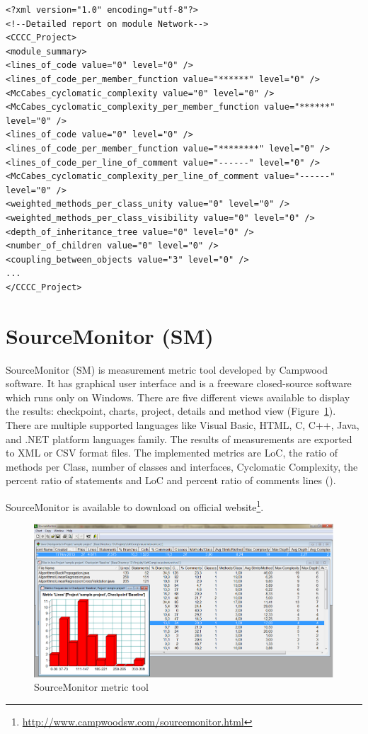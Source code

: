 \begin{lstlisting}[caption=XML representation of results generated by CCCC metric tool, label=ccccXml]
<?xml version="1.0" encoding="utf-8"?>
<!--Detailed report on module Network-->
<CCCC_Project>
<module_summary>
<lines_of_code value="0" level="0" />
<lines_of_code_per_member_function value="******" level="0" />
<McCabes_cyclomatic_complexity value="0" level="0" />
<McCabes_cyclomatic_complexity_per_member_function value="******" level="0" />
<lines_of_code value="0" level="0" />
<lines_of_code_per_member_function value="********" level="0" />
<lines_of_code_per_line_of_comment value="------" level="0" />
<McCabes_cyclomatic_complexity_per_line_of_comment value="------" level="0" />
<weighted_methods_per_class_unity value="0" level="0" />
<weighted_methods_per_class_visibility value="0" level="0" />
<depth_of_inheritance_tree value="0" level="0" />
<number_of_children value="0" level="0" />
<coupling_between_objects value="3" level="0" />
...
</CCCC_Project>
\end{lstlisting}

\section{SourceMonitor (SM)}
SourceMonitor (SM) is measurement metric tool developed by Campwood software. It has graphical user interface and is a freeware closed-source software which runs only on Windows. There are five different views available to display the results: checkpoint, charts, project, details and method view (Figure~\ref{fig:sourcemonitor}). There are multiple supported languages like Visual Basic, HTML, C, C++, Java, and .NET platform languages family. The results of measurements are exported to XML or CSV format files. The implemented metrics are \ac{LoC}, the ratio of methods per Class, number of classes and interfaces, Cyclomatic Complexity, the percent ratio of statements and \ac{LoC} and percent ratio of comments lines (\cite{indie}).

SourceMonitor is available to download on official website\footnote{\url{http://www.campwoodsw.com/sourcemonitor.html}}.

\begin{figure}[h!]
	\centering
	\includegraphics[scale=0.4]{img/sourcemonitor.png} 
	\caption{SourceMonitor metric tool}		
	\label{fig:sourcemonitor}
\end{figure}

